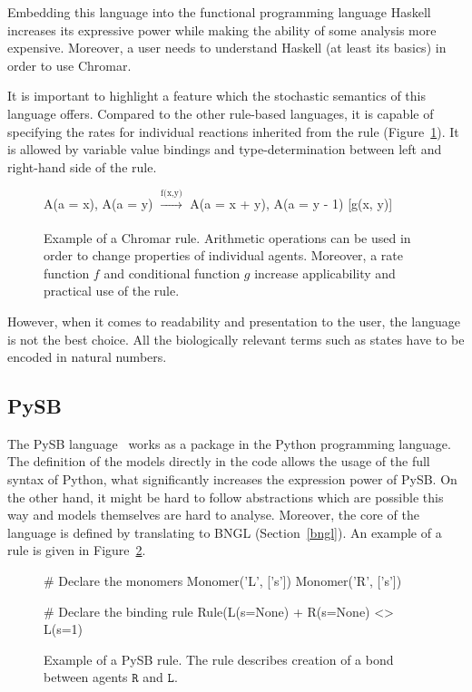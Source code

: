 \documentclass[12pt, twoside]{fithesis2} %
\begin{document}
Embedding this language into the functional programming language Haskell increases its expressive power while making the ability of some analysis more expensive. Moreover, a user needs to understand Haskell (at least its basics) in order to use Chromar.

It is important to highlight a feature which the stochastic semantics of this language offers. Compared to the other rule-based languages, it is capable of specifying the rates for individual reactions inherited from the rule (Figure~\ref{chromar_rule}). It is allowed by variable value bindings and type-determination between left and right-hand side of the rule.

\begin{figure}[!h]
\begin{center}
A(a = x), A(a = y) $\xrightarrow[]{\text{f(x,y)}}$ A(a = x + y), A(a = y - 1) [g(x, y)]
\end{center}
\caption{Example of a Chromar rule. Arithmetic operations can be used in order to change properties of individual agents. Moreover, a rate function $f$ and conditional function $g$ increase applicability and practical use of the rule.}\label{chromar-rule}\label{chromar_rule}
\end{figure}

However, when it comes to readability and presentation to the user, the language is not the best choice. All the biologically relevant terms such as states have to be encoded in natural numbers.

\subsection{PySB}

The PySB language~\cite{Lopez646} works as a package in the Python programming language. The definition of the models directly in the code allows the usage of the full syntax of Python, what significantly increases the expression power of PySB. On the other hand, it might be hard to follow abstractions which are possible this way and models themselves are hard to analyse. Moreover, the core of the language is defined by translating to BNGL (Section~\ref{bngl}). An example of a rule is given in Figure~\ref{pysb_rule}.

\begin{figure}[!h]
\begin{center}
\begin{python}
# Declare the monomers
Monomer('L', ['s'])
Monomer('R', ['s'])

# Declare the binding rule
Rule(L(s=None) + R(s=None) <> L(s=1) %
\end{python}
\end{center}
\caption{Example of a PySB rule. The rule describes creation of a bond between agents $\mathtt{R}$ and $\mathtt{L}$.}\label{PySB-rule}\label{pysb_rule}
\end{figure}
\end{document}

